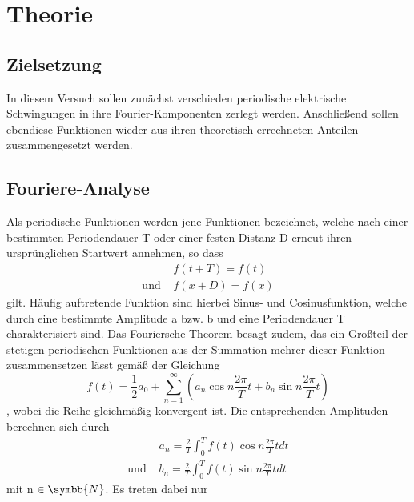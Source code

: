 \section{Theorie}
\label{sec:Theorie}
\subsection{Zielsetzung}
In diesem Versuch sollen zunächst verschieden periodische elektrische
Schwingungen in ihre Fourier-Komponenten zerlegt werden. Anschließend sollen
ebendiese Funktionen wieder aus ihren theoretisch errechneten Anteilen
zusammengesetzt werden.

\subsection{Fouriere-Analyse}
Als periodische Funktionen werden jene Funktionen bezeichnet, welche nach
einer bestimmten Periodendauer T oder einer festen Distanz D erneut ihren
ursprünglichen Startwert annehmen, so dass
\begin{align}
  & f(t+T)=f(t) \\
  \text{und    }      & f(x+D)=f(x)
  \label{eqn:period}
\end{align}
gilt. Häufig auftretende Funktion sind hierbei Sinus- und Cosinusfunktion,
welche durch eine bestimmte Amplitude a bzw. b und eine Periodendauer T
charakterisiert sind.
Das Fouriersche Theorem besagt zudem, das ein Großteil der stetigen periodischen
Funktionen aus der Summation mehrer dieser Funktion zusammensetzen lässt gemäß
der Gleichung
\begin{equation}
   f(t)= \frac{1}{2}a_0 + \sum_{n=1}^\infty (a_n \cos n \frac{2 \pi}{T}t
   + b_n \sin n \frac{2 \pi}{T}t)
\end{equation}
, wobei die Reihe gleichmäßig konvergent ist. Die entsprechenden Amplituden
berechnen sich durch
\begin{align}
  & a_n = \frac{2}{T} \int_0^T f(t) \cos n \frac{2 \pi}{T}t dt \\
  \text{und    }     & b_n = \frac{2}{T} \int_0^T f(t) \sin n \frac{2 \pi}
  {T}t dt
\end{align}
mit n $\in \symbb{N} $. Es treten dabei nur 
